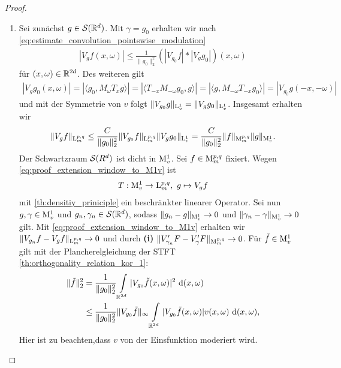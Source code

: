 \begin{proof}
\begin{enumerate}[label =\textbf{(\roman*)}]
		\item
		Sei zunächst $ g \in \S(\R^d) $.
		Mit $ \gamma = g_0 $ erhalten wir nach \eqref{eq:estimate_convolution_pointswise_modulation} 
		\begin{align*}
		| V_g f (x,\omega)|
		\leq
		\frac{1}{\|g_0\|_2^2}
		(|V_{g_0} f  |\ast | V_g g_0 | )(x,\omega)
		\end{align*}
		für $ (x,\omega) \in \R^{2d} $. Des weiteren gilt
		\begin{align*}
		|V_{g}  g_0(x,\omega)|
		=
		| \langle g_0 , M_\omega T_x g \rangle | 
		=
		| \langle T_{-x} M_{-\omega} g_0, g \rangle |
		=
		| \langle g , M_{- \omega} T_{-x} g_0 \rangle |
		=
		| V_{g_0} g(-x, -\omega) |
		\end{align*}
		und mit der Symmetrie von $ v $ folgt 
		$ \| V_{g_0} g \|_{\L_v^1} = \| V_g g_0\|_{\L^1_v} $.
		Insgesamt erhalten wir
		\begin{align}\label{eq:proof_extension_window_to_M1v}
		\| V_g f \|_{\L_m^{p,q}}
		\leq 
		\frac{C}{\| g_0 \|_2^2}
		\| V_{g_0 } f \|_{\L_m^{p,q}}
		\| V_g g_0 \|_{\L_v^1}
		=
		\frac{C}{\| g_0 \|_2^2}
		\| f \|_{\M_m^{p,q}}
		\| g \|_{\M_v^1}.
		\end{align}
		Der Schwartzraum $ \S(R^d) $ ist dicht in $ \M_v^1 $. Sei $ f \in \M_{m}^{p,q} $ fixiert.
		Wegen \eqref{eq:proof_extension_window_to_M1v} ist 
		\begin{align*}
		T : \M^1_v \to \L_m^{p,q},\
		 g \mapsto V_g f
		\end{align*} 
		mit \ref{th:densitiy_priniciple} ein beschränkter linearer Operator.
		Sei nun $ g, \gamma \in \M_v^1 $ und $ g_n, \gamma_n \in \S(\R^d) $, sodass
		$ \| g_n - g \|_{\M_v^1} \to 0  $ und $ \| \gamma_n - \gamma \|_{\M_v^1} \to 0 $ gilt. Mit \eqref{eq:proof_extension_window_to_M1v} erhalten wir
		$\| V_{g_n } f - V_g f \|_{\L_m^{p,q}} \to 0$
		und durch \textbf{(i)} $ \| V^\prime_{\gamma_n} F - V_{\gamma}^\prime F \|_{\M_m^{p,q}} \to 0$.
		Für $ \tilde{f}\in \M_v^1 $ gilt mit der Plancherelgleichung der STFT \ref{th:orthogonality_relation_kor_1}:
		\begin{align*}
		\| \tilde{f} \|_2^2
		&=
		\frac{1}{\| g_0 \|_2^2}
		\int \limits_{\R^{2d}}
		| V_{g_0} \tilde{f}(x,\omega)|^2 \td{(x,\omega)} \\
		&\leq
		\frac{1}{\| g_0 \|_2^2}
		\| V_{g_0} \tilde{f} \|_\infty
		\int \limits_{\R^{2d}}
		| V_{g_0} \tilde{f}(x,\omega)| v(x,\omega) \td{(x,\omega)},
		\end{align*}
		Hier ist zu beachten,dass $ v $ von der Einsfunktion moderiert wird.

\end{enumerate}
\end{proof}
